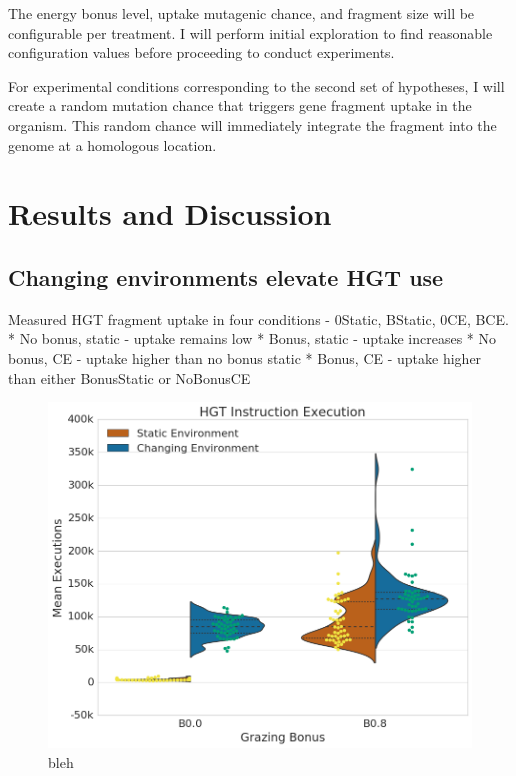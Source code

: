 \documentclass[PhD]{msu-thesis}
\begin{document}
The energy bonus level, uptake mutagenic chance, and fragment size will be configurable per treatment. I will perform initial exploration to find reasonable configuration values before proceeding to conduct experiments.

For experimental conditions corresponding to the second set of hypotheses, I will create a random mutation chance that triggers gene fragment uptake in the organism. This random chance will immediately integrate the fragment into the genome at a homologous location.

\section{Results and Discussion}


\subsection{Changing environments elevate HGT use}
Measured HGT fragment uptake in four conditions - 0Static, BStatic, 0CE, BCE.
* No bonus, static - uptake remains low
* Bonus, static - uptake increases
* No bonus, CE - uptake higher than no bonus static
* Bonus, CE - uptake higher than either BonusStatic or NoBonusCE

\begin{figure}[h!]
\begin{center}
\includegraphics[width=0.7\columnwidth]{figures/HGT/hgt_inst_execution.png}
\caption{bleh
}\label{fig:hgt_inst_execution}
\end{center}
\end{figure}
\end{document}
